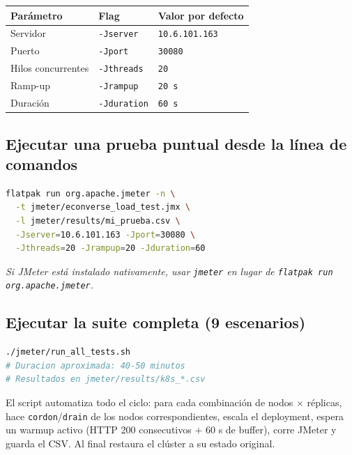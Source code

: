\documentclass[11pt,a4paper]{article}
\begin{document}
\begin{center}
\begin{tabular}{lll}
\toprule
\textbf{Parámetro} & \textbf{Flag} & \textbf{Valor por defecto} \\
\midrule
Servidor              & \texttt{-Jserver}   & \texttt{10.6.101.163} \\
Puerto                & \texttt{-Jport}     & \texttt{30080} \\
Hilos concurrentes    & \texttt{-Jthreads}  & \texttt{20} \\
Ramp-up               & \texttt{-Jrampup}   & \texttt{20 s} \\
Duración              & \texttt{-Jduration} & \texttt{60 s} \\
\bottomrule
\end{tabular}
\end{center}

\subsection{Ejecutar una prueba puntual desde la línea de comandos}

\begin{lstlisting}[language=bash]
flatpak run org.apache.jmeter -n \
  -t jmeter/econverse_load_test.jmx \
  -l jmeter/results/mi_prueba.csv \
  -Jserver=10.6.101.163 -Jport=30080 \
  -Jthreads=20 -Jrampup=20 -Jduration=60
\end{lstlisting}

\textit{Si JMeter está instalado nativamente, usar \texttt{jmeter} en lugar de \texttt{flatpak run org.apache.jmeter}.}

\subsection{Ejecutar la suite completa (9 escenarios)}

\begin{lstlisting}[language=bash]
./jmeter/run_all_tests.sh
# Duracion aproximada: 40-50 minutos
# Resultados en jmeter/results/k8s_*.csv
\end{lstlisting}

El script automatiza todo el ciclo: para cada combinación de nodos $\times$ réplicas, hace \texttt{cordon}/\texttt{drain} de los nodos correspondientes, escala el deployment, espera un warmup activo (HTTP 200 consecutivos $+$ 60 s de buffer), corre JMeter y guarda el CSV. Al final restaura el clúster a su estado original.
\end{document}

